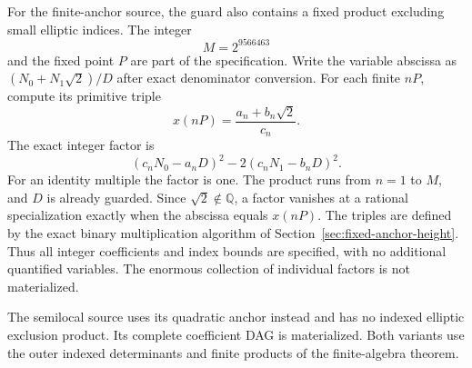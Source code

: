 For the finite-anchor source, the guard also contains a fixed
product excluding small elliptic indices.  The integer
\[
                             M=2^{9566463}
\]
and the fixed point $P$ are part of the specification.  Write the
variable abscissa as $(N_0+N_1\sqrt2)/D$ after exact denominator
conversion.  For each finite $nP$, compute its primitive triple
\[
                        x(nP)=\frac{a_n+b_n\sqrt2}{c_n}.
\]
The exact integer factor is
\[
                  (c_nN_0-a_nD)^2-2(c_nN_1-b_nD)^2.
\]
For an identity multiple the factor is one.  The product runs
from $n=1$ to $M$, and $D$ is already guarded.  Since
$\sqrt2\notin\mathbb Q$, a factor vanishes at a rational
specialization exactly when the abscissa equals $x(nP)$.
The triples are defined by the exact binary multiplication
algorithm of Section~\ref{sec:fixed-anchor-height}.  Thus all
integer coefficients and index bounds are specified, with no
additional quantified variables.  The enormous collection of
individual factors is not materialized.

The semilocal source uses its quadratic anchor instead and has
no indexed elliptic exclusion product.  Its complete coefficient
DAG is materialized.  Both variants use the outer indexed
determinants and finite products of the finite-algebra theorem.


